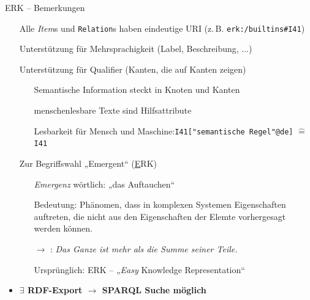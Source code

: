\documentclass[
	ngerman,
	10pt,				%
	aspectratio=169 	%
]{beamer}
\newcommand{\tca}[1]{\textcolor{mygray}{#1}}
\begin{document}
\begin{frame}[t,fragile,label=erk8]{\large ERK -- Bemerkungen }


\begin{itemize}
 

 \item[\tca{\textbullet}] Alle \textit{Item}s und \texttt{Relation}s haben eindeutige URI (z.\,B. \texttt{erk:/builtins\#I41})
 \item[\tca{\textbullet}] Unterstützung für Mehrsprachigkeit (Label, Beschreibung, ...)
 
 \item[\tca{\textbullet}] Unterstützung für Qualifier (Kanten, die auf Kanten zeigen)
 \begin{itemize}
  \item[\tca{\textbullet}] Semantische Information steckt in Knoten und Kanten
  \item[\tca{\textbullet}] menschenlesbare Texte sind Hilfsattribute
 \item[\tca{\textbullet}] Lesbarkeit für Mensch und Maschine:\quad \texttt{I41["{}semantische Regel"@de]} $\hat{=}$ \texttt{I41}
 \end{itemize}
 
 \medskip
 \item[\tca{\textbullet}] Zur Begriffswahl „Emergent“ (\underline{E}RK)
 

\begin{itemize}
 \item[\tca{\textbullet}] \textit{Emergenz} wörtlich: „das Auftauchen“
 \item[\tca{\textbullet}] Bedeutung: Phänomen, dass in komplexen Systemen Eigenschaften auftreten, die nicht aus den Eigenschaften der Elemte vorhergesagt werden können.
 \item[\tca{$\rightarrow$}]: \textit{Das Ganze ist mehr als die Summe seiner Teile.}
 
 \medskip
 \item[\tca{\textbullet}] Ursprünglich: ERK -- „\textit{Easy} Knowledge Representation“
\end{itemize}

\end{itemize}

 

\begin{itemize}
\item \textbf{$\exists$ RDF-Export $\rightarrow$ SPARQL Suche möglich}

\end{itemize}




\end{frame}
\end{document}
